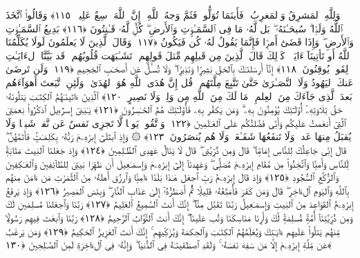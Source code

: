  وَلِلَّهِ ٱلمَشرِقُ وَٱلمَغرِبُ ۚ فَأَينَمَا تُوَلُّوا۟ فَثَمَّ وَجهُ ٱللَّهِ ۚ إِنَّ ٱللَّهَ وَٟسِعٌ عَلِيمٌۭ ﴿١١٥﴾
 وَقَالُوا۟ ٱتَّخَذَ ٱللَّهُ وَلَدًۭا ۗ سُبحَـٰنَهُۥ ۖ بَل لَّهُۥ مَا فِى ٱلسَّمَـٰوَٟتِ وَٱلأَرضِ ۖ كُلٌّۭ لَّهُۥ قَـٰنِتُونَ ﴿١١٦﴾
 بَدِيعُ ٱلسَّمَـٰوَٟتِ وَٱلأَرضِ ۖ وَإِذَا قَضَىٰٓ أَمرًۭا فَإِنَّمَا يَقُولُ لَهُۥ كُن فَيَكُونُ ﴿١١٧﴾
 وَقَالَ ٱلَّذِينَ لَا يَعلَمُونَ لَولَا يُكَلِّمُنَا ٱللَّهُ أَو تَأتِينَآ ءَايَةٌۭ ۗ كَذَٟلِكَ قَالَ ٱلَّذِينَ مِن قَبلِهِم مِّثلَ قَولِهِم ۘ تَشَـٰبَهَت قُلُوبُهُم ۗ قَد بَيَّنَّا ٱلءَايَـٰتِ لِقَومٍۢ يُوقِنُونَ ﴿١١٨﴾
 إِنَّآ أَرسَلنَـٰكَ بِٱلحَقِّ بَشِيرًۭا وَنَذِيرًۭا ۖ وَلَا تُسـَٔلُ عَن أَصحَـٰبِ ٱلجَحِيمِ ﴿١١٩﴾
 وَلَن تَرضَىٰ عَنكَ ٱليَهُودُ وَلَا ٱلنَّصَـٰرَىٰ حَتَّىٰ تَتَّبِعَ مِلَّتَهُم ۗ قُل إِنَّ هُدَى ٱللَّهِ هُوَ ٱلهُدَىٰ ۗ وَلَئِنِ ٱتَّبَعتَ أَهوَآءَهُم بَعدَ ٱلَّذِى جَآءَكَ مِنَ ٱلعِلمِ ۙ مَا لَكَ مِنَ ٱللَّهِ مِن وَلِىٍّۢ وَلَا نَصِيرٍ ﴿١٢٠﴾
 ٱلَّذِينَ ءَاتَينَـٰهُمُ ٱلكِتَـٰبَ يَتلُونَهُۥ حَقَّ تِلَاوَتِهِۦٓ أُو۟لَـٰٓئِكَ يُؤمِنُونَ بِهِۦ ۗ وَمَن يَكفُر بِهِۦ فَأُو۟لَـٰٓئِكَ هُمُ ٱلخَـٰسِرُونَ ﴿١٢١﴾
 يَـٰبَنِىٓ إِسرَٰٓءِيلَ ٱذكُرُوا۟ نِعمَتِىَ ٱلَّتِىٓ أَنعَمتُ عَلَيكُم وَأَنِّى فَضَّلتُكُم عَلَى ٱلعَـٰلَمِينَ ﴿١٢٢﴾
 وَٱتَّقُوا۟ يَومًۭا لَّا تَجزِى نَفسٌ عَن نَّفسٍۢ شَيـًۭٔا وَلَا يُقبَلُ مِنهَا عَدلٌۭ وَلَا تَنفَعُهَا شَفَـٰعَةٌۭ وَلَا هُم يُنصَرُونَ ﴿١٢٣﴾
 ۞ وَإِذِ ٱبتَلَىٰٓ إِبرَٰهِۦمَ رَبُّهُۥ بِكَلِمَـٰتٍۢ فَأَتَمَّهُنَّ ۖ قَالَ إِنِّى جَاعِلُكَ لِلنَّاسِ إِمَامًۭا ۖ قَالَ وَمِن ذُرِّيَّتِى ۖ قَالَ لَا يَنَالُ عَهدِى ٱلظَّـٰلِمِينَ ﴿١٢٤﴾
 وَإِذ جَعَلنَا ٱلبَيتَ مَثَابَةًۭ لِّلنَّاسِ وَأَمنًۭا وَٱتَّخِذُوا۟ مِن مَّقَامِ إِبرَٰهِۦمَ مُصَلًّۭى ۖ وَعَهِدنَآ إِلَىٰٓ إِبرَٰهِۦمَ وَإِسمَـٰعِيلَ أَن طَهِّرَا بَيتِىَ لِلطَّآئِفِينَ وَٱلعَـٰكِفِينَ وَٱلرُّكَّعِ ٱلسُّجُودِ ﴿١٢٥﴾
 وَإِذ قَالَ إِبرَٰهِۦمُ رَبِّ ٱجعَل هَـٰذَا بَلَدًا ءَامِنًۭا وَٱرزُق أَهلَهُۥ مِنَ ٱلثَّمَرَٰتِ مَن ءَامَنَ مِنهُم بِٱللَّهِ وَٱليَومِ ٱلءَاخِرِ ۖ قَالَ وَمَن كَفَرَ فَأُمَتِّعُهُۥ قَلِيلًۭا ثُمَّ أَضطَرُّهُۥٓ إِلَىٰ عَذَابِ ٱلنَّارِ ۖ وَبِئسَ ٱلمَصِيرُ ﴿١٢٦﴾
 وَإِذ يَرفَعُ إِبرَٰهِۦمُ ٱلقَوَاعِدَ مِنَ ٱلبَيتِ وَإِسمَـٰعِيلُ رَبَّنَا تَقَبَّل مِنَّآ ۖ إِنَّكَ أَنتَ ٱلسَّمِيعُ ٱلعَلِيمُ ﴿١٢٧﴾
 رَبَّنَا وَٱجعَلنَا مُسلِمَينِ لَكَ وَمِن ذُرِّيَّتِنَآ أُمَّةًۭ مُّسلِمَةًۭ لَّكَ وَأَرِنَا مَنَاسِكَنَا وَتُب عَلَينَآ ۖ إِنَّكَ أَنتَ ٱلتَّوَّابُ ٱلرَّحِيمُ ﴿١٢٨﴾
 رَبَّنَا وَٱبعَث فِيهِم رَسُولًۭا مِّنهُم يَتلُوا۟ عَلَيهِم ءَايَـٰتِكَ وَيُعَلِّمُهُمُ ٱلكِتَـٰبَ وَٱلحِكمَةَ وَيُزَكِّيهِم ۚ إِنَّكَ أَنتَ ٱلعَزِيزُ ٱلحَكِيمُ ﴿١٢٩﴾
 وَمَن يَرغَبُ عَن مِّلَّةِ إِبرَٰهِۦمَ إِلَّا مَن سَفِهَ نَفسَهُۥ ۚ وَلَقَدِ ٱصطَفَينَـٰهُ فِى ٱلدُّنيَا ۖ وَإِنَّهُۥ فِى ٱلءَاخِرَةِ لَمِنَ ٱلصَّـٰلِحِينَ ﴿١٣٠﴾
